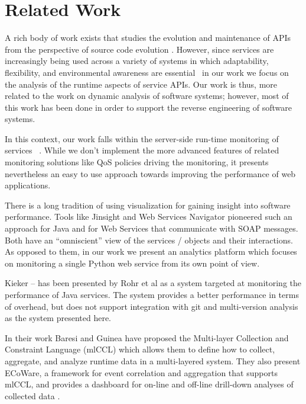 
\section{Related Work}
\label{sec:related}



A rich body of work exists that studies the evolution and maintenance of APIs from the perspective of source code evolution \cite{dig2006apis, hora2015developers, hora2015apiwave}. However, since services are increasingly being used across a variety of systems in which adaptability, flexibility, and environmental awareness are essential~\cite{pernici2016monitoring} in our work we focus on the analysis of the runtime aspects of service APIs. Our work is thus, more related to the work on dynamic analysis of software systems; however, most of this work has been done in order to support the reverse engineering of software systems\cite{Corn09-dynamic}. 

In this context, our work falls within the server-side run-time monitoring of services ~\cite{ghezzi2007run}. While we don't implement the more advanced features of related monitoring solutions like QoS policies driving the monitoring, it presents nevertheless an easy to use approach towards improving the performance of web applications.

There is a long tradition of using visualization for gaining insight into software performance. Tools like Jinsight \cite{Pauw02a} and Web Services Navigator \cite{Pauw05} pioneered such an approach for Java and for Web Services that communicate with SOAP messages. Both have an ``omniscient'' view of the services / objects and their interactions. As opposed to them, in our work we present an analytics platform which focuses on monitoring a single Python web service from its own point of view.

Kieker -- has been presented by Rohr et al \cite{Rohr08} as a system targeted at monitoring the performance of Java services. The system provides a better performance in terms of overhead, but does not support integration with git and multi-version analysis as the system presented here. 



In their work Baresi and Guinea have proposed the Multi-layer Collection and Constraint Language (mlCCL) which allows them to define how to collect, aggregate, and analyze runtime data in a multi-layered system. They also present ECoWare, a framework for event correlation and aggregation that supports mlCCL, and provides a dashboard for on-line and off-line drill-down analyses of collected data \cite{Bare13-monitoring}.

